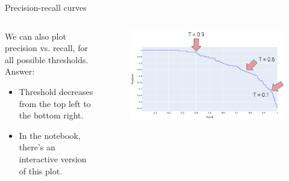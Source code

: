 \documentclass[aspectratio=169]{../latex_main/tntbeamer}  %
\begin{document}
	
	\begin{frame}{Precision-recall curves}
	    \begin{columns}
	        \begin{column}{.5\textwidth}
	        We can also plot precision vs. recall, for all possible thresholds.\\
	        \bigskip
	        Answer: 
	             \begin{itemize}
	                 \item Threshold decreases from the top left to the bottom right.
	                 \item In the notebook, there’s an interactive version of this plot.
	             \end{itemize} 
	        \end{column}
	        
	        
	        \begin{column}{.5\textwidth}
	                \begin{figure}
	                    \centering
	                    \includegraphics[scale=.35]{Bild24}
	                \end{figure}
	                
	                
	        \end{column}
	        
	    \end{columns}
	\end{frame}
	
\end{document}
